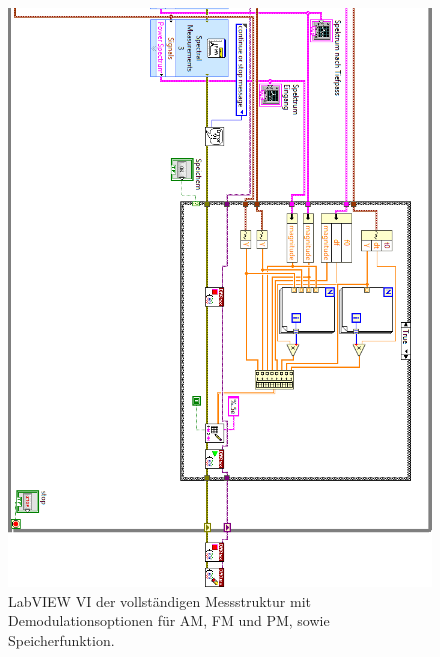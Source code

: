 	\begin{figure}[H]
		\centering
		\includegraphics[width=\textwidth]{pic/messstruktur_dafpm3.png}
		\caption{LabVIEW VI der vollständigen Messstruktur mit Demodulationsoptionen für AM, FM und PM, sowie Speicherfunktion.}
		\label{fig:messstruktur_dafpm}	
	\end{figure} 
	
